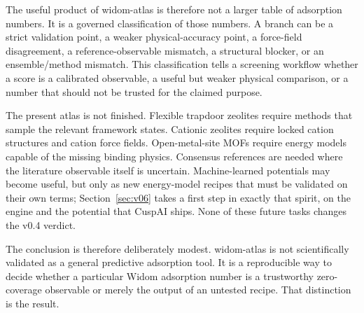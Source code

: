 The useful product of widom-atlas is therefore not a larger table of adsorption numbers. It is a governed classification of those numbers. A branch can be a strict validation point, a weaker physical-accuracy point, a force-field disagreement, a reference-observable mismatch, a structural blocker, or an ensemble/method mismatch. This classification tells a screening workflow whether a score is a calibrated observable, a useful but weaker physical comparison, or a number that should not be trusted for the claimed purpose.

The present atlas is not finished. Flexible trapdoor zeolites require methods that sample the relevant framework states. Cationic zeolites require locked cation structures and cation force fields. Open-metal-site MOFs require energy models capable of the missing binding physics. Consensus references are needed where the literature observable itself is uncertain. Machine-learned potentials may become useful, but only as new energy-model recipes that must be validated on their own terms; Section~\ref{sec:v06} takes a first step in exactly that spirit, on the engine and the potential that CuspAI ships. None of these future tasks changes the v0.4 verdict.

The conclusion is therefore deliberately modest. widom-atlas is not scientifically validated as a general predictive adsorption tool. It is a reproducible way to decide whether a particular Widom adsorption number is a trustworthy zero-coverage observable or merely the output of an untested recipe. That distinction is the result.
